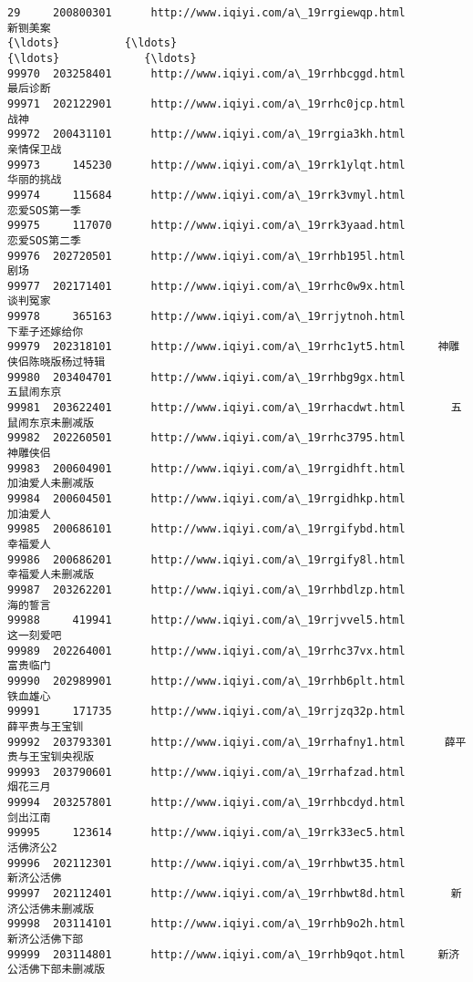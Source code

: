 \documentclass[11pt]{article}
\begin{document}
\begin{Verbatim}[commandchars=\\\{\}]
29     200800301      http://www.iqiyi.com/a\_19rrgiewqp.html            新铡美案   
{\ldots}          {\ldots}                                         {\ldots}             {\ldots}   
99970  203258401      http://www.iqiyi.com/a\_19rrhbcggd.html            最后诊断   
99971  202122901      http://www.iqiyi.com/a\_19rrhc0jcp.html              战神   
99972  200431101      http://www.iqiyi.com/a\_19rrgia3kh.html           亲情保卫战   
99973     145230      http://www.iqiyi.com/a\_19rrk1ylqt.html           华丽的挑战   
99974     115684      http://www.iqiyi.com/a\_19rrk3vmyl.html        恋爱SOS第一季   
99975     117070      http://www.iqiyi.com/a\_19rrk3yaad.html        恋爱SOS第二季   
99976  202720501      http://www.iqiyi.com/a\_19rrhb195l.html              剧场   
99977  202171401      http://www.iqiyi.com/a\_19rrhc0w9x.html            谈判冤家   
99978     365163      http://www.iqiyi.com/a\_19rrjytnoh.html         下辈子还嫁给你   
99979  202318101      http://www.iqiyi.com/a\_19rrhc1yt5.html     神雕侠侣陈晓版杨过特辑   
99980  203404701      http://www.iqiyi.com/a\_19rrhbg9gx.html           五鼠闹东京   
99981  203622401      http://www.iqiyi.com/a\_19rrhacdwt.html       五鼠闹东京未删减版   
99982  202260501      http://www.iqiyi.com/a\_19rrhc3795.html            神雕侠侣   
99983  200604901      http://www.iqiyi.com/a\_19rrgidhft.html        加油爱人未删减版   
99984  200604501      http://www.iqiyi.com/a\_19rrgidhkp.html            加油爱人   
99985  200686101      http://www.iqiyi.com/a\_19rrgifybd.html            幸福爱人   
99986  200686201      http://www.iqiyi.com/a\_19rrgify8l.html        幸福爱人未删减版   
99987  203262201      http://www.iqiyi.com/a\_19rrhbdlzp.html            海的誓言   
99988     419941      http://www.iqiyi.com/a\_19rrjvvel5.html           这一刻爱吧   
99989  202264001      http://www.iqiyi.com/a\_19rrhc37vx.html            富贵临门   
99990  202989901      http://www.iqiyi.com/a\_19rrhb6plt.html            铁血雄心   
99991     171735      http://www.iqiyi.com/a\_19rrjzq32p.html         薛平贵与王宝钏   
99992  203793301      http://www.iqiyi.com/a\_19rrhafny1.html      薛平贵与王宝钏央视版   
99993  203790601      http://www.iqiyi.com/a\_19rrhafzad.html            烟花三月   
99994  203257801      http://www.iqiyi.com/a\_19rrhbcdyd.html            剑出江南   
99995     123614      http://www.iqiyi.com/a\_19rrk33ec5.html           活佛济公2   
99996  202112301      http://www.iqiyi.com/a\_19rrhbwt35.html           新济公活佛   
99997  202112401      http://www.iqiyi.com/a\_19rrhbwt8d.html       新济公活佛未删减版   
99998  203114101      http://www.iqiyi.com/a\_19rrhb9o2h.html         新济公活佛下部   
99999  203114801      http://www.iqiyi.com/a\_19rrhb9qot.html     新济公活佛下部未删减版   


\end{Verbatim}
\end{document}
